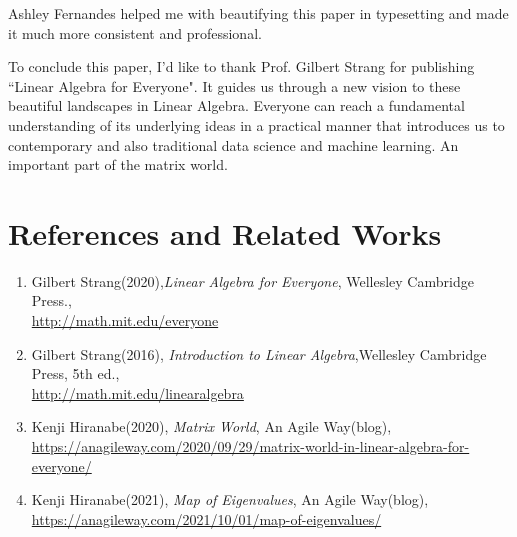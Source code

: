 \documentclass[letterpaper]{article}
\begin{document}
Ashley Fernandes helped me with beautifying this paper in typesetting
and made it much more consistent and professional.

To conclude this paper, I'd like to thank Prof. Gilbert Strang for
publishing ``Linear Algebra for Everyone". It guides us
through a new vision to these beautiful landscapes in Linear Algebra.
Everyone can reach a fundamental understanding of its underlying ideas
in a practical manner that introduces us to contemporary and also
traditional data science and machine learning. An important part of the matrix world.

\section*{References and Related Works}
\begin{enumerate}
  \item 
  Gilbert Strang(2020),\emph{Linear Algebra for Everyone}, Wellesley Cambridge Press.,\\
  \href{http://math.mit.edu/everyone}{http://math.mit.edu/everyone}
  \item
  Gilbert Strang(2016), \emph{Introduction to Linear Algebra},Wellesley Cambridge Press, 5th ed.,\\
  \href{http://math.mit.edu/linearalgebra}{http://math.mit.edu/linearalgebra}
  \item Kenji Hiranabe(2020), \emph{Matrix World}, An Agile Way(blog),\\
  \href{https://anagileway.com/2020/09/29/matrix-world-in-linear-algebra-for-everyone/}{https://anagileway.com/2020/09/29/matrix-world-in-linear-algebra-for-everyone/}
  \item Kenji Hiranabe(2021), \emph{Map of Eigenvalues}, An Agile Way(blog),\\
  \href{https://anagileway.com/2021/10/01/map-of-eigenvalues/}{https://anagileway.com/2021/10/01/map-of-eigenvalues/}
\end{enumerate}
\end{document}
